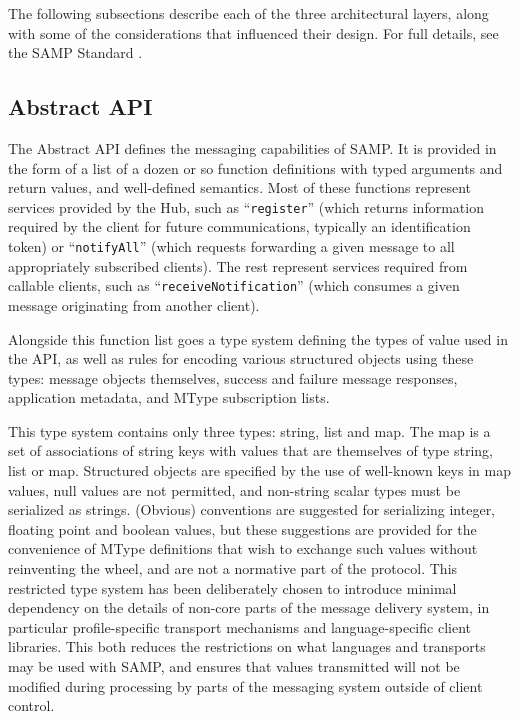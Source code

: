 \documentclass[5p]{elsarticle}
\begin{document}
The following subsections describe each of the three architectural layers,
along with some of the considerations that influenced their design.
For full details, see the SAMP Standard \citep{samp_std}.

\subsection{Abstract API} \label{sec:abstractApi}

The Abstract API defines the messaging capabilities of SAMP.
It is provided in the form of a list of a dozen or so function definitions
with typed arguments and return values, and well-defined semantics.
Most of these functions represent services provided by the Hub, such as
``{\tt register}'' (which returns information required by the
client for future communications, typically an identification token)
or ``{\tt notifyAll}'' (which requests forwarding a given message to
all appropriately subscribed clients).
The rest represent services required from callable clients, such as
``{\tt receiveNotification}'' (which consumes a given message originating
from another client).

Alongside this function list goes a type system defining the types of value
used in the API, as well as rules for encoding various structured objects
using these types: message objects themselves, success and failure
message responses, application metadata, and MType subscription lists.

This type system contains only three types:
string, list and map.
The map is a set of associations of string keys with
values that are themselves of type string, list or map.
Structured objects are specified by the use of well-known keys in map values,
null values are not permitted,
and non-string scalar types must be serialized as strings.
(Obvious) conventions are suggested for serializing
integer, floating point and boolean values,
but these suggestions are provided for the convenience
of MType definitions that wish to exchange such values without
reinventing the wheel, and are not a normative part of the protocol.
This restricted type system has been deliberately chosen to introduce
minimal dependency on the details of
non-core parts of the message delivery system,
in particular profile-specific transport mechanisms and language-specific
client libraries.
This both reduces the restrictions on what languages and transports
may be used with SAMP, and ensures that values transmitted will
not be modified during processing by parts of the messaging system
outside of client control.
\end{document}

